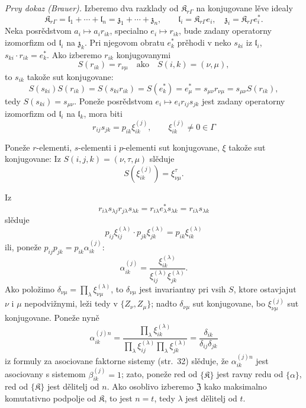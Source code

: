\documentclass[11pt]{article}
\begin{document}
\emph{Prvy dokaz (Brauer).} Izberemo dva razklady od \(\mathfrak K_{r\Gamma}\) na konjugovane lěve idealy
\[
\mathfrak K_{r\Gamma}=\mathfrak l_1+\cdots+\mathfrak l_n=\mathfrak z_1+\cdots+\mathfrak z_n,\qquad
\mathfrak l_i=\mathfrak K_{r\Gamma}e_i,\quad
\mathfrak z_i=\mathfrak K_{r\Gamma}e_i^*.
\]
Neka posrědstvom \(a_i\mapsto a_ir_{ik}\), specialno \(e_i\mapsto r_{ik}\), bude zadany operatorny izomorfizm od \(\mathfrak l_i\) na \(\mathfrak z_k\). Pri njegovom obratu \(e_k^*\) prěhodi v neko \(s_{ki}\) iz \(\mathfrak l_i\), \(s_{ki}\cdot r_{ik}=e_k^*\). Ako izberemo \(r_{ik}\) konjugovanymi
\[
S(r_{ik})=r_{\nu\mu}\quad\text{ako}\quad S(i,k)=(\nu,\mu),
\]
to \(s_{ik}\) takože sut konjugovane:
\[
S(s_{ki})S(r_{ik})=S(s_{ki}r_{ik})=S(e_k^*)=e_\mu^*
=s_{\mu\nu}r_{\nu\mu}=s_{\mu\nu}S(r_{ik}),
\]
tedy \(S(s_{ki})=s_{\mu\nu}\). Poneže posrědstvom \(e_i\mapsto e_ir_{ij}s_{jk}\) jest zadany operatorny izomorfizm od \(\mathfrak l_i\) na \(\mathfrak l_k\), mora biti
\[
r_{ij}s_{jk}=p_{ik}\xi_{ik}^{(j)},\qquad
\xi_{ik}^{(j)}\ne0\in\Gamma
\]

Poneže \(r\)-elementi, \(s\)-elementi i \(p\)-elementi sut konjugovane, \(\xi\) takože sut konjugovane: Iz \(S(i,j,k)=(\nu,\tau,\mu)\) slěduje
\[
S(\xi_{ik}^{(j)})=\xi_{\nu\mu}^{\tau}.
\]

Iz
\[
r_{i\lambda}s_{\lambda j}r_{j\lambda}s_{\lambda k}
=r_{i\lambda}e_\lambda^*s_{\lambda k}
=r_{i\lambda}s_{\lambda k}
\]
slěduje
\[
p_{ij}\xi_{ij}^{(\lambda)}\cdot p_{jk}\xi_{jk}^{(\lambda)}
=p_{ik}\xi_{ik}^{(\lambda)}
\]
ili, poneže \(p_{ij}p_{jk}=p_{ik}\alpha_{ik}^{(j)}\):
\[
\alpha_{ik}^{(j)}
=\frac{\xi_{ik}^{(\lambda)}}{\xi_{ij}^{(\lambda)}\xi_{jk}^{(\lambda)}}.
\]
Ako položimo \(\delta_{\nu\mu}=\prod_{\lambda}\xi_{\nu\mu}^{(\lambda)}\), to \(\delta_{\nu\mu}\) jest invariantny pri vsih \(S\), ktore ostavjajut \(\nu\) i \(\mu\) nepodvižnymi, leži tedy v \(\{Z_\nu,Z_\mu\}\); nadto \(\delta_{\nu\mu}\) sut konjugovane, bo \(\xi_{\nu\mu}^{(j)}\) sut konjugovane. Poneže nyně
\[
\alpha_{ik}^{(j)n}
=\frac{\prod_{\lambda}\xi_{ik}^{(\lambda)}}
       {\prod_{\lambda}\xi_{ij}^{(\lambda)}\prod_{\lambda}\xi_{jk}^{(\lambda)}}
=\frac{\delta_{ik}}{\delta_{ij}\delta_{jk}}
\]
iz formuly za asociovane faktorne sistemy (str.~32) slěduje, že \(\alpha_{ik}^{(j)n}\) jest asociovany s sistemom \(\beta_{ik}^{(j)}=1\); zato, poneže red od \(\{\mathfrak K\}\) jest ravny redu od \(\{\alpha\}\), red od \(\{\mathfrak K\}\) jest dělitelj od \(n\). Ako osoblivo izberemo \(\mathfrak Z\) kako maksimalno komutativno podpolje od \(\mathfrak K\), to jest \(n=t\), tedy \(\lambda\) jest dělitelj od \(t\).
\end{document}
